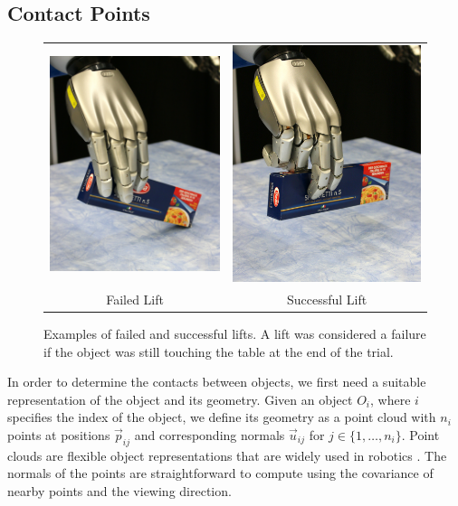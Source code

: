 \subsection{Contact Points\label{sub:Contact-Points}}

\begin{figure}
\begin{centering}
\begin{tabular}{cc}
\includegraphics[width=0.23\columnwidth]{oli/PicsforIROS2014/3FingLift} & \includegraphics[width=0.23\columnwidth]{oli/PicsforIROS2014/4FingLift}\tabularnewline
Failed Lift & Successful Lift\tabularnewline
\end{tabular}
\par\end{centering}

\caption{\label{fig:good-and-bad-lift}Examples of failed and successful lifts.
A lift was considered a failure if the object was still touching the
table at the end of the trial.}
\end{figure}
In order to determine the contacts between objects, we first need
a suitable representation of the object and its geometry. Given an
object $O_{i}$, where $i$ specifies the index of the object, we
define its geometry as a point cloud with $n_{i}$ points at positions
$\vec{p}_{ij}$ and corresponding normals $\vec{u}_{ij}$ for $j\in\{1,\ldots,n_{i}\}$.
Point clouds are flexible object representations that are widely used
in robotics \cite{Rusu_ICRA2011_PCL}. The normals of the points are
straightforward to compute using the covariance of nearby points and
the viewing direction.

